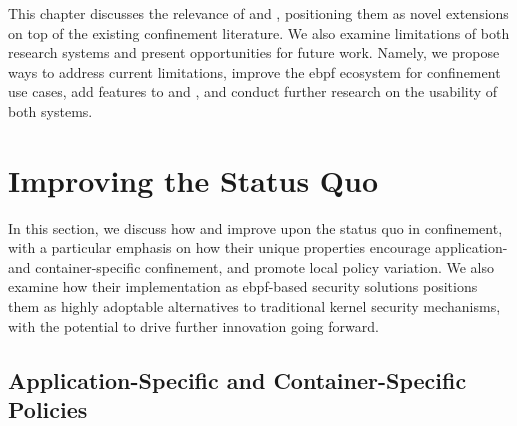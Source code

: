 This chapter discusses the relevance of \bpfbox{} and \bpfcontain{}, positioning them as
novel extensions on top of the existing confinement literature. We also examine
limitations of both research systems and present opportunities for future work. Namely, we
propose ways to address current limitations, improve the \gls{ebpf} ecosystem for
confinement use cases, add features to \bpfbox{} and \bpfcontain{}, and conduct further
research on the usability of both systems.

\section{Improving the Status Quo}%
\label{s:disc-improving}

In this section, we discuss how \bpfbox{} and \bpfcontain{} improve upon the status quo in
confinement, with a particular emphasis on how their unique properties encourage
application- and container-specific confinement, and promote local policy variation. We
also examine how their implementation as \gls{ebpf}-based security solutions positions
them as highly adoptable alternatives to traditional kernel security mechanisms, with the
potential to drive further innovation going forward.

\subsection{Application-Specific and Container-Specific Policies}

